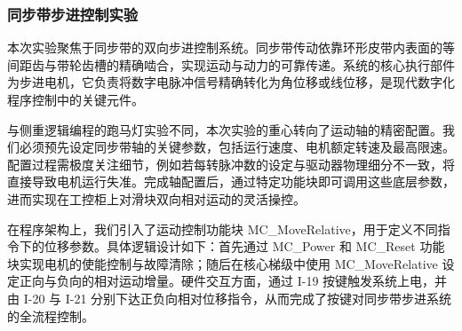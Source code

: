 \documentclass{article}
\begin{document}
\subsubsection{同步带步进控制实验}
本次实验聚焦于同步带的双向步进控制系统。同步带传动依靠环形皮带内表面的等间距齿与带轮齿槽的精确啮合，实现运动与动力的可靠传递。系统的核心执行部件为步进电机，它负责将数字电脉冲信号精确转化为角位移或线位移，是现代数字化程序控制中的关键元件。\par
与侧重逻辑编程的跑马灯实验不同，本次实验的重心转向了运动轴的精密配置。我们必须预先设定同步带轴的关键参数，包括运行速度、电机额定转速及最高限速。配置过程需极度关注细节，例如若每转脉冲数的设定与驱动器物理细分不一致，将直接导致电机运行失准。完成轴配置后，通过特定功能块即可调用这些底层参数，进而实现在工控柜上对滑块双向相对运动的灵活操控。\par
在程序架构上，我们引入了运动控制功能块 MC\_MoveRelative，用于定义不同指令下的位移参数。具体逻辑设计如下：首先通过 MC\_Power 和 MC\_Reset 功能块实现电机的使能控制与故障清除；随后在核心梯级中使用 MC\_MoveRelative 设定正向与负向的相对运动增量。硬件交互方面，通过 I-19 按键触发系统上电，并由 I-20 与 I-21 分别下达正负向相对位移指令，从而完成了按键对同步带步进系统的全流程控制。
\end{document}
